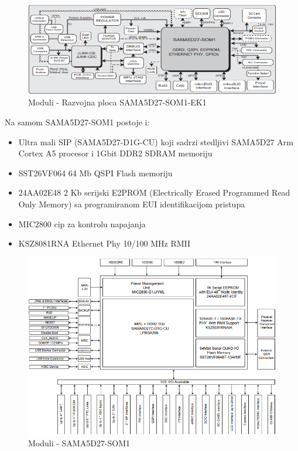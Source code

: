 \documentclass[a4paper,12pt, master]{etf}
\begin{document}
	\begin{figure}[htb]
		\centering
		\includegraphics[scale=.7]{../pic/hw_modules.png}
		\caption{Moduli - Razvojna ploca SAMA5D27-SOM1-EK1}
		\label{fig:hw_modules}
	\end{figure}

	Na samom SAMA5D27-SOM1 postoje i:
	\begin{itemize}
		\item Ultra mali SIP (SAMA5D27-D1G-CU) koji sadrzi stedljivi SAMA5D27 Arm Cortex A5
		procesor i 1Gbit DDR2 SDRAM memoriju
		\item SST26VF064 64 Mb QSPI Flash memoriju
		\item 24AA02E48 2 Kb serijski E2PROM (Electrically Erased Programmed Read Only Memory) sa
		programiranom EUI identifikacijom pristupa
		\item MIC2800 cip za kontrolu napajanja
		\item KSZ8081RNA Ethernet Phy 10/100 MHz RMII
	\end{itemize}

	\begin{figure}[htb]
		\centering
		\includegraphics[scale=.7]{../pic/hw_som_modules.PNG}
		\caption{Moduli - SAMA5D27-SOM1}
		\label{fig:hw_som_modules}
	\end{figure}
\end{document}
